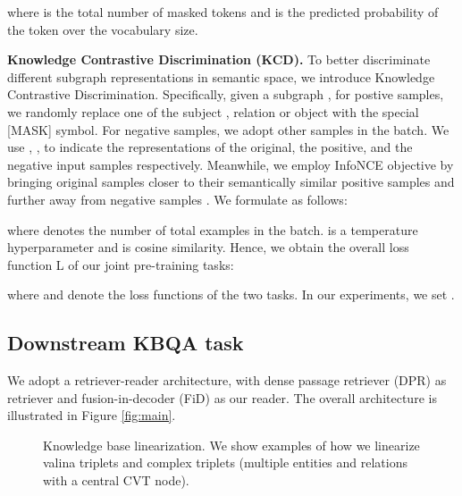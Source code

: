 \documentclass[sigconf,natbib=true,anonymous=False]{acmart}
\begin{document}
where  is the total number of masked tokens and  is the predicted probability of the token  over the vocabulary size.

\textbf{Knowledge Contrastive Discrimination (KCD).} To better discriminate different subgraph representations in semantic space, we introduce Knowledge Contrastive Discrimination. Specifically, given a subgraph , for postive samples, we randomly replace one of the subject , relation  or object  with the special [MASK] symbol. For negative samples, we adopt other samples in the batch. We use , ,  to indicate the representations of the original, the positive, and the negative input samples respectively. Meanwhile, we employ InfoNCE \cite{aitchison2021infonce} objective by bringing original samples  closer to their semantically similar positive samples  and further away from negative samples . We formulate  as follows:

where  denotes the number of total examples in the batch.  is a temperature hyperparameter and  is cosine similarity. Hence, we obtain the overall loss function L of our joint pre-training tasks:

where  and  denote the loss functions of the two tasks. In our experiments, we set .
\subsection{Downstream KBQA task}
We adopt a retriever-reader architecture, with dense passage retriever (DPR) 
 \cite{karpukhin2020dense} as retriever and fusion-in-decoder (FiD) \cite{izacard2020leveraging} as our reader. The overall architecture is illustrated in Figure \ref{fig:main}.
\begin{figure}[t]
\centering

\caption{Knowledge base linearization. We show examples of how we linearize valina triplets and complex triplets (multiple entities and relations with a central CVT node).}
\vspace{-0.2cm} 
\label{fig:linear}
\vspace{-0.2cm} 
\end{figure}
\end{document}

